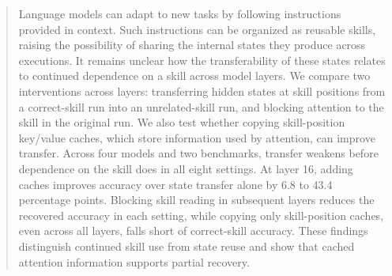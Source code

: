\begin{abstract}
Language models can adapt to new tasks by following instructions provided in context.
Such instructions can be organized as reusable skills, raising the possibility of sharing the internal states they produce across executions.
It remains unclear how the transferability of these states relates to continued dependence on a skill across model layers.
We compare two interventions across layers: transferring hidden states at skill positions from a correct-skill run into an unrelated-skill run, and blocking attention to the skill in the original run.
We also test whether copying skill-position key/value caches, which store information used by attention, can improve transfer.
Across four models and two benchmarks, transfer weakens before dependence on the skill does in all eight settings.
At layer 16, adding caches improves accuracy over state transfer alone by 6.8 to 43.4 percentage points.
Blocking skill reading in subsequent layers reduces the recovered accuracy in each setting, while copying only skill-position caches, even across all layers, falls short of correct-skill accuracy.
These findings distinguish continued skill use from state reuse and show that cached attention information supports partial recovery.
\end{abstract}
